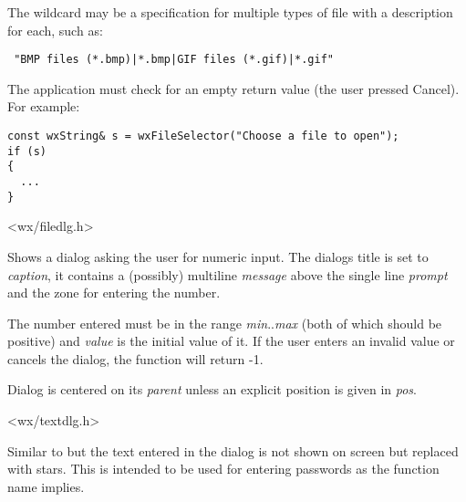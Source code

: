 The wildcard may be a specification for multiple types of file 
with a description for each, such as:

\begin{verbatim}
 "BMP files (*.bmp)|*.bmp|GIF files (*.gif)|*.gif"
\end{verbatim}

The application must check for an empty return value (the user pressed
Cancel). For example:

\begin{verbatim}
const wxString& s = wxFileSelector("Choose a file to open");
if (s)
{
  ...
}
\end{verbatim}


<wx/filedlg.h>

\label{wxgetnumberfromuser}


Shows a dialog asking the user for numeric input. The dialogs title is set to 
{\it caption}, it contains a (possibly) multiline {\it message} above the
single line {\it prompt} and the zone for entering the number.

The number entered must be in the range {\it min}..{\it max} (both of which
should be positive) and {\it value} is the initial value of it. If the user
enters an invalid value or cancels the dialog, the function will return -1.

Dialog is centered on its {\it parent} unless an explicit position is given in 
{\it pos}.


<wx/textdlg.h>

\label{wxgetpasswordfromuser}


Similar to  but the text entered
in the dialog is not shown on screen but replaced with stars. This is intended
to be used for entering passwords as the function name implies.

